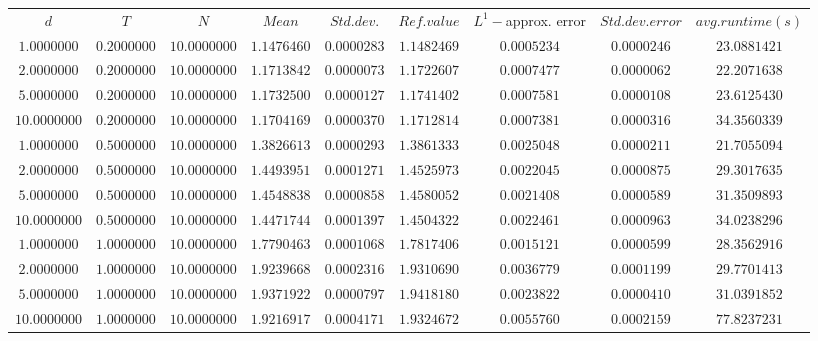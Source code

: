 \begin{tabular}{ccccccccc}
$d$ & $T$ & $N$ & $Mean$ & $Std. dev.$ & $Ref. value$ & $L^1-$approx. error & $Std. dev. error$ & $avg. runtime (s)$\\
$1.0000000$ & $0.2000000$ & $10.0000000$ & $1.1476460$ & $0.0000283$ & $1.1482469$ & $0.0005234$ & $0.0000246$ & $23.0881421$\\
$2.0000000$ & $0.2000000$ & $10.0000000$ & $1.1713842$ & $0.0000073$ & $1.1722607$ & $0.0007477$ & $0.0000062$ & $22.2071638$\\
$5.0000000$ & $0.2000000$ & $10.0000000$ & $1.1732500$ & $0.0000127$ & $1.1741402$ & $0.0007581$ & $0.0000108$ & $23.6125430$\\
$10.0000000$ & $0.2000000$ & $10.0000000$ & $1.1704169$ & $0.0000370$ & $1.1712814$ & $0.0007381$ & $0.0000316$ & $34.3560339$\\
$1.0000000$ & $0.5000000$ & $10.0000000$ & $1.3826613$ & $0.0000293$ & $1.3861333$ & $0.0025048$ & $0.0000211$ & $21.7055094$\\
$2.0000000$ & $0.5000000$ & $10.0000000$ & $1.4493951$ & $0.0001271$ & $1.4525973$ & $0.0022045$ & $0.0000875$ & $29.3017635$\\
$5.0000000$ & $0.5000000$ & $10.0000000$ & $1.4548838$ & $0.0000858$ & $1.4580052$ & $0.0021408$ & $0.0000589$ & $31.3509893$\\
$10.0000000$ & $0.5000000$ & $10.0000000$ & $1.4471744$ & $0.0001397$ & $1.4504322$ & $0.0022461$ & $0.0000963$ & $34.0238296$\\
$1.0000000$ & $1.0000000$ & $10.0000000$ & $1.7790463$ & $0.0001068$ & $1.7817406$ & $0.0015121$ & $0.0000599$ & $28.3562916$\\
$2.0000000$ & $1.0000000$ & $10.0000000$ & $1.9239668$ & $0.0002316$ & $1.9310690$ & $0.0036779$ & $0.0001199$ & $29.7701413$\\
$5.0000000$ & $1.0000000$ & $10.0000000$ & $1.9371922$ & $0.0000797$ & $1.9418180$ & $0.0023822$ & $0.0000410$ & $31.0391852$\\
$10.0000000$ & $1.0000000$ & $10.0000000$ & $1.9216917$ & $0.0004171$ & $1.9324672$ & $0.0055760$ & $0.0002159$ & $77.8237231$\\
\end{tabular}
